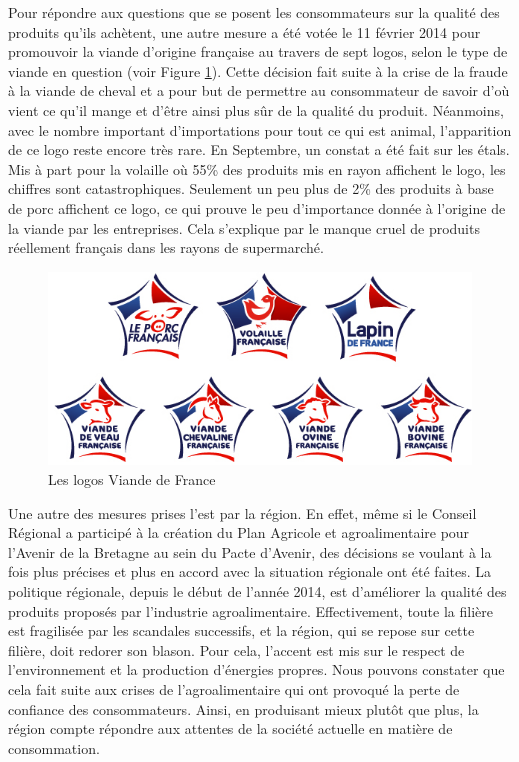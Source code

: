 \documentclass[a4paper,12pt]{report}
\begin{document}
			Pour répondre aux questions que se posent les consommateurs sur la qualité des produits qu’ils achètent, une autre mesure a été votée le 11 février 2014 pour promouvoir la viande d’origine française au travers de sept logos, selon le type de viande en question (voir Figure \ref{VDF}). Cette décision fait suite à la crise de la fraude à la viande de cheval et a pour but de permettre au consommateur de savoir d’où vient ce qu’il mange et d’être ainsi plus sûr de la qualité du produit. Néanmoins, avec le nombre important d’importations pour tout ce qui est animal, l’apparition de ce logo reste encore très rare. En Septembre, un constat a été fait sur les étals. Mis à part pour la volaille où 55\% des produits mis en rayon affichent le logo, les chiffres sont catastrophiques. Seulement un peu plus de 2\% des produits à base de porc affichent ce logo, ce qui prouve le peu d’importance donnée à l’origine de la viande par les entreprises\cite{FlopVDF}. Cela s'explique par le manque cruel de produits réellement français dans les rayons de supermarché.

			\begin{figure}[!h]
			\centering
			\includegraphics[scale=0.5]{Illustrations/VDF.jpg}
			\caption{Les logos Viande de France}
			\label{VDF}
			\end{figure}

			Une autre des mesures prises l’est par la région. En effet, même si le Conseil Régional a participé à la création du Plan Agricole et agroalimentaire pour l'Avenir de la Bretagne au sein du Pacte d'Avenir\cite{PacteAvenirBretagne}, des décisions se voulant à la fois plus précises et plus en accord avec la situation régionale ont été faites. La politique régionale, depuis le début de l’année 2014, est d’améliorer la qualité des produits proposés par l’industrie agroalimentaire\cite{FavoriserQualiteAgricultureAgroalimentaire}. Effectivement, toute la filière est fragilisée par les scandales successifs, et la région, qui se repose sur cette filière, doit redorer son blason. Pour cela, l’accent est mis sur le respect de l’environnement et la production d’énergies propres. Nous pouvons constater que cela fait suite aux crises de l’agroalimentaire qui ont provoqué la perte de confiance des consommateurs. Ainsi, en produisant mieux plutôt que plus, la région compte répondre aux attentes de la société actuelle en matière de consommation.
\end{document}
